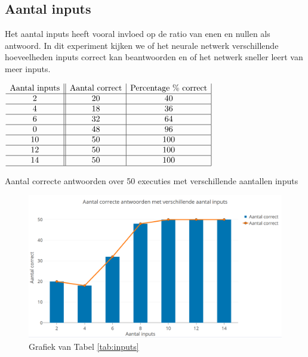 \subsection{Aantal inputs}
Het aantal inputs heeft vooral invloed op de ratio van enen en nullen als antwoord. In dit experiment kijken we of het neurale netwerk verschillende hoeveelheden inputs correct kan beantwoorden en of het netwerk sneller leert van meer inputs.

\begin{table}[ht]
    \centering
      $\begin{array}{c||c|c |}
        \text{Aantal inputs} & \text{Aantal correct} & \text{Percentage \% correct} \\ \hline
        2 & 20 & 40 \\ \hline
        4 & 18 & 36 \\ \hline
        6 & 32 & 64 \\ \hline
        0 & 48 & 96 \\ \hline
        10 & 50 & 100 \\ \hline
        12 & 50 & 100 \\ \hline
        14 & 50 & 100 \\ \hline
      \end{array}$
    \caption{Aantal correcte antwoorden over 50 executies met verschillende aantallen inputs}
    \label{tab:inputs}
\end{table}

\begin{figure}[ht!]
    \centering
    \includegraphics[scale=0.3]{graphs/inputs.png}
    \caption{Grafiek van Tabel \ref{tab:inputs}}
    \label{fig:inputs}
\end{figure}